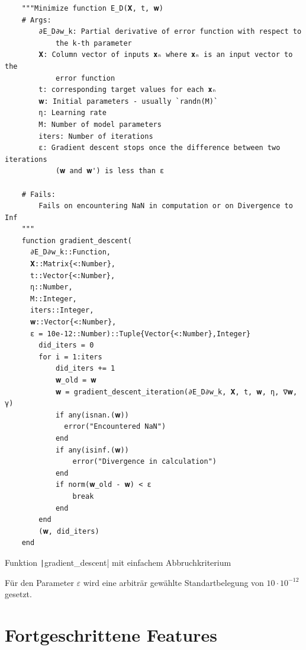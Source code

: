 \documentclass{article}
\theoremstyle{plain} %
\theoremstyle{definition} %
\begin{document}
\begin{listing}[H]
  \begin{verbatim} 
    """Minimize function E_D(𝐗, t, 𝐰)
    # Args:
        ∂E_D∂w_k: Partial derivative of error function with respect to
            the k-th parameter
        𝐗: Column vector of inputs 𝐱ₙ where 𝐱ₙ is an input vector to the
            error function
        t: corresponding target values for each 𝐱ₙ
        𝐰: Initial parameters - usually `randn(M)`
        η: Learning rate
        M: Number of model parameters
        iters: Number of iterations
        ε: Gradient descent stops once the difference between two iterations
            (𝐰 and 𝐰') is less than ε

    # Fails:
        Fails on encountering NaN in computation or on Divergence to Inf
    """
    function gradient_descent(
      ∂E_D∂w_k::Function,
      𝐗::Matrix{<:Number},
      t::Vector{<:Number},
      η::Number,
      M::Integer,
      iters::Integer,
      𝐰::Vector{<:Number},
      ε = 10e-12::Number)::Tuple{Vector{<:Number},Integer}
        did_iters = 0
        for i = 1:iters
            did_iters += 1
            𝐰_old = 𝐰
            𝐰 = gradient_descent_iteration(∂E_D∂w_k, 𝐗, t, 𝐰, η, ∇𝐰, γ)
            if any(isnan.(𝐰))
              error("Encountered NaN") 
            end
            if any(isinf.(𝐰))
                error("Divergence in calculation")
            end
            if norm(𝐰_old - 𝐰) < ε
                break
            end
        end
        (𝐰, did_iters)
    end
  \end{verbatim}
  \caption{Funktion \texttt|gradient_descent| mit einfachem Abbruchkriterium}
  \label{listing:simplebreak}
\end{listing}

Für den Parameter $\varepsilon$ wird eine arbiträr gewählte Standartbelegung von $10\cdot10^{-12}$ gesetzt.

\section{Fortgeschrittene Features}
\end{document}
